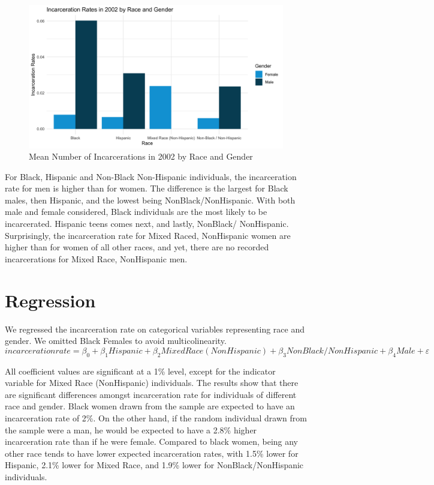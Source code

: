 \documentclass{article}
\begin{document}
\begin{figure}[H]
    \begin{center}
        \includegraphics[width=.85\textwidth]{incarcerations_by_racegender.png}
    \end{center}
    \caption{Mean Number of Incarcerations in 2002 by Race and Gender}
    \label{fig:graph}
\end{figure}

For Black, Hispanic and Non-Black Non-Hispanic individuals, the incarceration rate for men is higher than for women. The difference is the largest for Black males, then Hispanic, and the lowest being NonBlack/NonHispanic. 
With both male and female considered, Black individuals are the most likely to be incarcerated. Hispanic teens comes next, and lastly, NonBlack/ NonHispanic. Surprisingly, the incarceration rate for Mixed Raced, NonHispanic women
are higher than for women of all other races, and yet, there are no recorded incarcerations for Mixed Race, NonHispanic men. 

\section{Regression}

We regressed the incarceration rate on categorical variables representing race and gender. We omitted Black Females to avoid multicolinearity. 
$$
incarceration rate = \beta_{0} + \beta_{1}Hispanic + \beta_{2}Mixed Race (NonHispanic) + \beta_{3} NonBlack/ NonHispanic + \beta_{4} Male + \varepsilon
$$

All coefficient values are significant at a 1\% level, except for the indicator variable for Mixed Race (NonHispanic) individuals. The results show that there are significant differences amongst incarceration rate for individuals of different race and gender. Black women drawn from the sample are expected to have an incarceration rate of 2\%. On the other hand, if the random individual drawn from the sample were a man, he would be expected to have a 2.8\% higher incarceration rate than if he were female. Compared to black women, being any other race tends to have lower expected incarceration rates, with 1.5\% lower for Hispanic, 2.1\% lower for Mixed Race, and 1.9\% lower for NonBlack/NonHispanic individuals.
\end{document}
